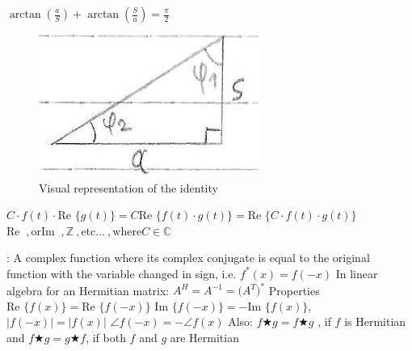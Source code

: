 \documentclass[12pt]{article}
\def\Re{\text{Re\ }} %
\def\Im{\text{Im\ }} %
\begin{document}
\begin{flushleft}
	\textbullet \quad $\arctan \left( \frac{a}{S} \right) + \arctan \left( \frac{S}{a} \right) = \frac{\pi}{2} $ \linebreak 

	\begin{figure}[H]
	\centering
	\includegraphics[scale=2.5]{complex_arctan}
	\caption{Visual representation of the identity}
	\label{fig:complex_arctan}
	\end{figure}

	\textbullet \quad $C \cdot f(t) \cdot \Re\{g(t) \} = C \Re\{ f(t) \cdot g(t) \} = \Re\{ C\cdot f(t) \cdot g(t) \} $ \linebreak 
	$\Re \ , \text{or} \Im \ , \mathbb{Z}\ , \text{etc} \ldots \ , \text{where} C \in \mathbb{C}$ \linebreak 

	\textbullet \quad {}: A complex function where its complex conjugate is equal to the original function with the variable changed in sign, i.e. $f^*(x) = f(-x) $ \linebreak 
	\textbullet \quad In linear algebra for an Hermitian matrix: $A^H = A^{-1} = \big(A^T\big)^* $ 
	Properties \linebreak 
	\textbullet \quad $\Re\{f(x) \} = \Re \{ f(-x) \} $ \linebreak 
	\textbullet \quad $\Im\{ f(-x) \} = - \Im \{ f(x) \} $, \linebreak 
	\textbullet \quad $|f(-x)| = |f(x) | $ \linebreak 
	\textbullet \quad $\angle f(-x) = - \angle f(x) $ \linebreak 
	\textbullet \quad Also: $f \bigstar g = f \bigstar g $ , if $f$ is Hermitian and \linebreak 
	\textbullet \quad $f \bigstar g = g \bigstar f $, if both $f$ and $g$ are Hermitian \linebreak 
	

\end{flushleft}
\end{document}
